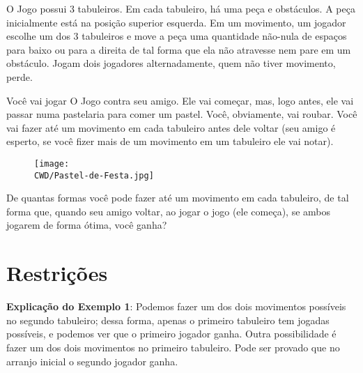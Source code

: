 %

O Jogo possui 3 tabuleiros. Em cada tabuleiro, há uma peça e obstáculos. A peça inicialmente está na posição superior esquerda. Em um movimento, um jogador escolhe um dos 3 tabuleiros e move a peça uma quantidade não-nula de espaços para baixo ou para a direita de tal forma que ela não atravesse nem pare em um obstáculo. Jogam dois jogadores alternadamente, quem não tiver movimento, perde.

Você vai jogar O Jogo contra seu amigo. Ele vai começar, mas, logo antes, ele vai passar numa pastelaria para comer um pastel. Você, obviamente, vai roubar. Você vai fazer até um movimento em cada tabuleiro antes dele voltar (seu amigo é esperto, se você fizer mais de um movimento em um tabuleiro ele vai notar).

\begin{figure}[H]
    \centering
    \texttt{[image: \\CWD/Pastel-de-Festa.jpg]}
  \end{figure}

De quantas formas você pode fazer até um movimento em cada tabuleiro, de tal forma que, quando seu amigo voltar, ao jogar o jogo (ele começa), se ambos jogarem de forma ótima, você ganha?

%
%


%
%


\section*{Restrições}


\sampleio

\bigskip
\textbf{Explicação do Exemplo 1}: Podemos fazer um dos dois movimentos possíveis no segundo tabuleiro; dessa forma, apenas o primeiro tabuleiro tem jogadas possíveis, e podemos ver que o primeiro jogador ganha. Outra possibilidade é fazer um dos dois movimentos no primeiro tabuleiro. Pode ser provado que no arranjo inicial o segundo jogador ganha.

